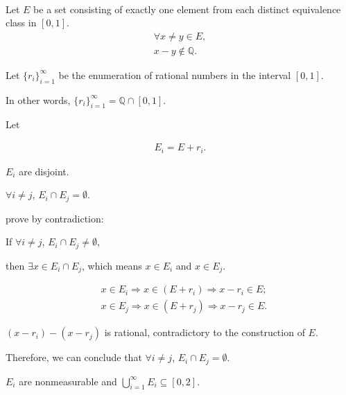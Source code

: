 \documentclass[UTF8,a4paper,10pt]{article}
\begin{document}
\pagebreak
\begin{solution}\,

  Let $E$ be a set consisting of exactly one element
  from each distinct equivalence class in \([0,1]\).
  \begin{equation*}
    \begin{aligned}
      \forall x\neq y\in E,\\
       x-y \notin \mathbb{Q}.
    \end{aligned}
  \end{equation*}

  Let \(\{r_i\}_{i=1}^{\infty}\) be the enumeration of rational numbers in the interval \([0, 1]\).
  
  In other words, \(\{r_i\}_{i=1}^{\infty}=\mathbb{Q} \cap [0,1]\).
  
  Let

\begin{equation*}
  \begin{aligned}
    E_i = E+r_i.
  \end{aligned}
\end{equation*}

 \(E_i\) are disjoint.

 
\begin{mybox}{}
  \(\forall i \neq j \), \(E_i\cap E_j = \emptyset\).

  prove by contradiction:

  If \(\forall i \neq j \), \(E_i\cap E_j \neq \emptyset\),

  then \(\exists x\in E_i\cap E_j \),
  which means \( x\in E_i\) and \(x\in E_j\).

  \begin{equation*}
    \begin{aligned}
      &x\in E_i\Rightarrow x\in (E+r_i)\Rightarrow x-r_i\in E;\\
      &x\in E_j\Rightarrow x\in (E+r_j) \Rightarrow x-r_j\in E.
    \end{aligned}
  \end{equation*}

  \((x-r_i)-(x-r_j)\) is rational, contradictory to the construction of \(E\).

  Therefore, we can conclude that  \(\forall i \neq j \), \(E_i\cap E_j = \emptyset\).



\end{mybox}


\(E_i\) are nonmeasurable and \(\bigcup_{i=1}^{\infty} E_i \subseteq [0,2]\).


\end{solution}
\end{document}
